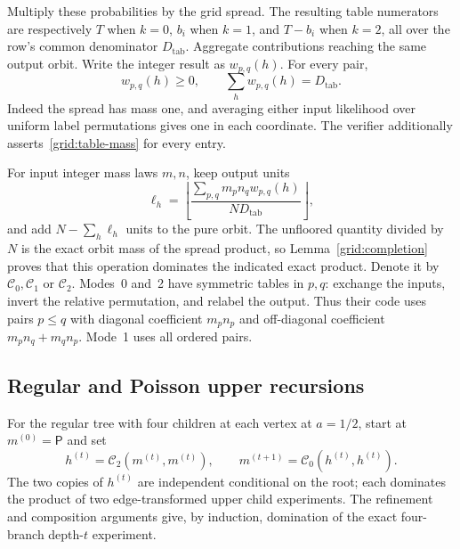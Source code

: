 Multiply these probabilities by the grid spread.  The resulting table
numerators are respectively $T$ when $k=0$, $b_i$ when $k=1$, and
$T-b_i$ when $k=2$, all over the row's common denominator
$D_{\mathrm{tab}}$.  Aggregate contributions reaching the same output
orbit.  Write the integer result as $w_{p,q}(h)$.  For every pair,
\begin{equation}
 w_{p,q}(h)\geq0,\qquad \sum_h w_{p,q}(h)=D_{\mathrm{tab}}.
 \label{grid:table-mass}
\end{equation}
Indeed the spread has mass one, and averaging either input likelihood
over uniform label permutations gives one in each coordinate.  The
verifier additionally asserts~\eqref{grid:table-mass} for every entry.

For input integer mass laws $m,n$, keep output units
\begin{equation}
 \ell_h=\left\lfloor
  \frac{\sum_{p,q}m_pn_qw_{p,q}(h)}{N D_{\mathrm{tab}}}
 \right\rfloor,
 \label{grid:combine}
\end{equation}
and add $N-\sum_h\ell_h$ units to the pure orbit.  The unfloored
quantity divided by $N$ is the exact orbit mass of the spread product,
so Lemma~\ref{grid:completion} proves that this operation dominates the
indicated exact product.  Denote it by $\mathcal C_0,\mathcal C_1$ or
$\mathcal C_2$.  Modes~0 and~2 have symmetric tables in $p,q$: exchange
the inputs, invert the relative permutation, and relabel the output.
Thus their code uses pairs $p\leq q$ with diagonal coefficient $m_pn_p$
and off-diagonal coefficient $m_pn_q+m_qn_p$.  Mode~1 uses all ordered
pairs.

\subsection{Regular and Poisson upper recursions}

For the regular tree with four children at each vertex at $a=1/2$, start at
$m^{(0)}=\mathsf P$ and set
\begin{equation}
 h^{(t)}=\mathcal C_2(m^{(t)},m^{(t)}),\qquad
 m^{(t+1)}=\mathcal C_0(h^{(t)},h^{(t)}).
 \label{grid:regular-recursion}
\end{equation}
The two copies of $h^{(t)}$ are independent conditional on the root;
each dominates the product of two edge-transformed upper child
experiments.  The refinement and composition arguments give, by
induction, domination of the exact four-branch depth-$t$ experiment.

